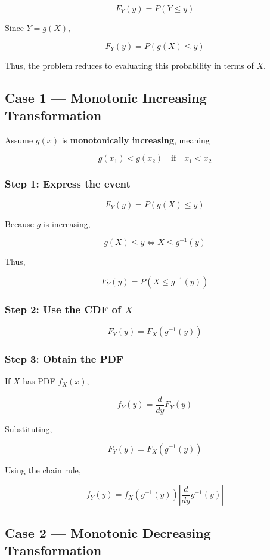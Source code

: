 \documentclass[12pt]{article}
\begin{document}
\[
F_Y(y) = P(Y \le y)
\]

Since $Y = g(X)$,

\[
F_Y(y) = P(g(X) \le y)
\]

Thus, the problem reduces to evaluating this probability in terms of $X$.

\subsection{Case 1 --- Monotonic Increasing Transformation}

Assume $g(x)$ is \textbf{monotonically increasing}, meaning

\[
g(x_1) < g(x_2) \quad \text{if} \quad x_1 < x_2
\]

\subsubsection*{Step 1: Express the event}

\[
F_Y(y) = P(g(X) \le y)
\]

Because $g$ is increasing,

\[
g(X) \le y \iff X \le g^{-1}(y)
\]

Thus,

\[
F_Y(y) = P(X \le g^{-1}(y))
\]

\subsubsection*{Step 2: Use the CDF of $X$}

\[
F_Y(y) = F_X(g^{-1}(y))
\]

\subsubsection*{Step 3: Obtain the PDF}

If $X$ has PDF $f_X(x)$,

\[
f_Y(y) = \frac{d}{dy}F_Y(y)
\]

Substituting,

\[
F_Y(y) = F_X(g^{-1}(y))
\]

Using the chain rule,

\[
f_Y(y) = f_X(g^{-1}(y)) 
\left|\frac{d}{dy} g^{-1}(y)\right|
\]

\subsection{Case 2 --- Monotonic Decreasing Transformation}
\end{document}
